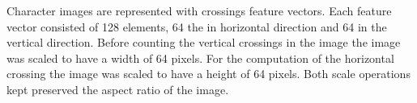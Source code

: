 Character images are represented with crossings feature vectors. Each feature vector consisted of 128 elements, 64 the in horizontal direction and 64 in the vertical direction. Before counting the vertical crossings in the image the image was scaled to have a width of 64 pixels. For the computation of the horizontal crossing the image was scaled to have a height of 64 pixels. Both scale operations kept preserved the aspect ratio of the image.